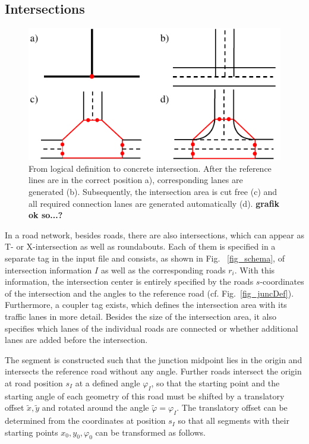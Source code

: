 \documentclass[a4paper, 10pt, conference]{ieeeconf}      %
\begin{document}
\subsection{Intersections}
    \begin{figure}[thpb]        
        \centering
        \includegraphics{fig/createJunction.pdf}
        \caption{From logical definition to concrete intersection. After the reference lines are in the correct position a), corresponding lanes are generated (b). Subsequently, the intersection area is cut free (c) and all required connection lanes are generated automatically (d). \textbf{grafik ok so...?}}
        \label{fig_createJunction}
    \end{figure}

    In a road network, besides roads, there are also intersections, which can appear as T- or X-intersection as well as roundabouts. Each of them is specified in a separate tag in the input file and consists, as shown in Fig.~ \ref{fig_schema}, of intersection information \(I\) as well as the corresponding roads \(r_i\). With this information, the intersection center is entirely specified by the roads $s$-coordinates of the intersection and the angles to the reference road (cf. Fig.~\ref{fig_juncDef}). Furthermore, a coupler tag exists, which defines the intersection area with its traffic lanes in more detail. Besides the size of the intersection area, it also specifies which lanes of the individual roads are connected or whether additional lanes are added before the intersection.

    The segment is constructed such that the junction midpoint lies in the origin and intersects the reference road without any angle. Further roads intersect the origin at road position \(s_I\) at a defined angle \(\varphi_I\), so that the starting point and the starting angle of each geometry of this road must be shifted by a translatory offset \(\tilde{x}, \tilde{y}\) and rotated around the angle \(\tilde{\varphi} = \varphi_I\). The translatory offset can be determined from the coordinates at position \(s_I\) so that all segments with their starting points \(x_0,y_0,\varphi_0\) can be transformed as follows.
\end{document}
